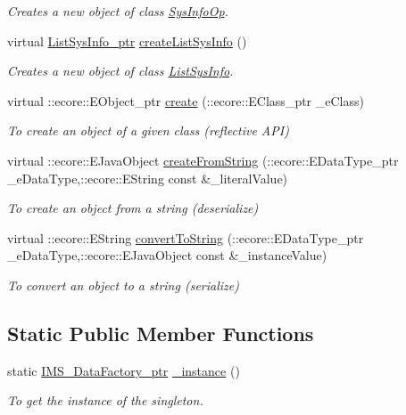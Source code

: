 \begin{DoxyCompactItemize}
\begin{DoxyCompactList}\small\item\em Creates a new object of class \hyperlink{classIMS__Data_1_1SysInfoOp}{SysInfoOp}. \item\end{DoxyCompactList}\item 
virtual \hyperlink{classIMS__Data_1_1ListSysInfo}{ListSysInfo\_\-ptr} \hyperlink{classIMS__Data_1_1IMS__DataFactory_af4a0f6dc403f1dd118ed3e0d6273a170}{createListSysInfo} ()
\begin{DoxyCompactList}\small\item\em Creates a new object of class \hyperlink{classIMS__Data_1_1ListSysInfo}{ListSysInfo}. \item\end{DoxyCompactList}\item 
virtual ::ecore::EObject\_\-ptr \hyperlink{classIMS__Data_1_1IMS__DataFactory_ac1d4efa9936b3da0a9f33c47391dbf52}{create} (::ecore::EClass\_\-ptr \_\-eClass)
\begin{DoxyCompactList}\small\item\em To create an object of a given class (reflective API) \item\end{DoxyCompactList}\item 
virtual ::ecore::EJavaObject \hyperlink{classIMS__Data_1_1IMS__DataFactory_ac5bae6d67b8a4cda99ac9de5245780ad}{createFromString} (::ecore::EDataType\_\-ptr \_\-eDataType,::ecore::EString const \&\_\-literalValue)
\begin{DoxyCompactList}\small\item\em To create an object from a string (deserialize) \item\end{DoxyCompactList}\item 
virtual ::ecore::EString \hyperlink{classIMS__Data_1_1IMS__DataFactory_a4cc15f794a0c8e3ba9183894c38fdad4}{convertToString} (::ecore::EDataType\_\-ptr \_\-eDataType,::ecore::EJavaObject const \&\_\-instanceValue)
\begin{DoxyCompactList}\small\item\em To convert an object to a string (serialize) \item\end{DoxyCompactList}\end{DoxyCompactItemize}
\subsection*{Static Public Member Functions}
\begin{DoxyCompactItemize}
\item 
static \hyperlink{classIMS__Data_1_1IMS__DataFactory}{IMS\_\-DataFactory\_\-ptr} \hyperlink{classIMS__Data_1_1IMS__DataFactory_ac37e57d17859fc37da50a19231a92db7}{\_\-instance} ()
\begin{DoxyCompactList}\small\item\em To get the instance of the singleton. \item\end{DoxyCompactList}\end{DoxyCompactItemize}
